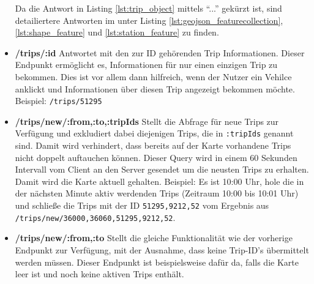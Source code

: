 \begin{itemize}[label={}]
    Da die Antwort in Listing \ref{lst:trip_object} mittels "`..."' gekürzt ist, sind detailiertere Antworten im  unter Listing \ref{lst:geojson_featurecollection}, \ref{lst:shape_feature} und \ref{lst:station_feature} zu finden.
  

    \item \textbf{/trips/:id} Antwortet mit den zur ID gehörenden Trip Informationen. Dieser Endpunkt ermöglicht es, Informationen für nur einen einzigen Trip zu bekommen. Dies ist vor allem dann hilfreich, wenn der Nutzer ein Vehilce anklickt und Informationen über diesen Trip angezeigt bekommen möchte. Beispiel: \texttt{/trips/51295}

    \item \textbf{/trips/new/:from,:to,:tripIds} Stellt die Abfrage für neue Trips zur Verfügung und exkludiert dabei diejenigen Trips, die in \texttt{:tripIds} genannt sind. Damit wird verhindert, dass bereits auf der Karte vorhandene Trips nicht doppelt auftauchen können. Dieser Query wird in einem 60 Sekunden Intervall vom Client an den Server gesendet um die neusten Trips zu erhalten. Damit wird die Karte aktuell gehalten. Beispiel: Es ist 10:00 Uhr, hole die in der nächsten Minute aktiv werdenden Trips (Zeitraum 10:00 bis 10:01 Uhr) und schließe die Trips mit der ID \texttt{51295,9212,52} vom Ergebnis aus \texttt{/trips/new/36000,36060,51295,9212,52}.

    \item \textbf{/trips/new/:from,:to} Stellt die gleiche Funktionalität wie der vorherige Endpunkt zur Verfügung, mit der Ausnahme, dass keine Trip-ID's übermittelt werden müssen. Dieser Endpunkt ist beispielsweise dafür da, falls die Karte leer ist und noch keine aktiven Trips enthält.

  \end{itemize}

